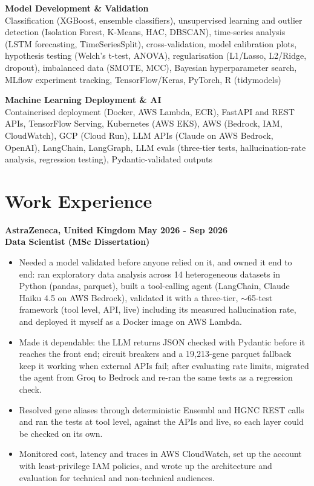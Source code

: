 \documentclass[a4paper,11pt]{article}
\begin{document}
\vspace{3pt}
\noindent \textbf{Model Development \& Validation}
    \\
    Classification (XGBoost, ensemble classifiers), unsupervised learning and outlier detection (Isolation Forest, K-Means, HAC, DBSCAN), time-series analysis (LSTM forecasting, TimeSeriesSplit), cross-validation, model calibration plots, hypothesis testing (Welch's t-test, ANOVA), regularisation (L1/Lasso, L2/Ridge, dropout), imbalanced data (SMOTE, MCC), Bayesian hyperparameter search, MLflow experiment tracking, TensorFlow/Keras, PyTorch, R (tidymodels)

\vspace{3pt}
\noindent \textbf{Machine Learning Deployment \& AI}
    \\
    Containerised deployment (Docker, AWS Lambda, ECR), FastAPI and REST APIs, TensorFlow Serving, Kubernetes (AWS EKS), AWS (Bedrock, IAM, CloudWatch), GCP (Cloud Run), LLM APIs (Claude on AWS Bedrock, OpenAI), LangChain, LangGraph, LLM evals (three-tier tests, hallucination-rate analysis, regression testing), Pydantic-validated outputs

\section{Work Experience}
\vspace{2pt}

\noindent
\textbf{AstraZeneca, United Kingdom}
\hfill \textbf{May 2026 - Sep 2026}
\\
\textbf{Data Scientist (MSc Dissertation)}
\begin{itemize}
    \item Needed a model validated before anyone relied on it, and owned it end to end: ran exploratory data analysis across 14 heterogeneous datasets in Python (pandas, parquet), built a tool-calling agent (LangChain, Claude Haiku 4.5 on AWS Bedrock), validated it with a three-tier, $\sim$65-test framework (tool level, API, live) including its measured hallucination rate, and deployed it myself as a Docker image on AWS Lambda.
    \item Made it dependable: the LLM returns JSON checked with Pydantic before it reaches the front end; circuit breakers and a 19,213-gene parquet fallback keep it working when external APIs fail; after evaluating rate limits, migrated the agent from Groq to Bedrock and re-ran the same tests as a regression check.
    \item Resolved gene aliases through deterministic Ensembl and HGNC REST calls and ran the tests at tool level, against the APIs and live, so each layer could be checked on its own.
    \item Monitored cost, latency and traces in AWS CloudWatch, set up the account with least-privilege IAM policies, and wrote up the architecture and evaluation for technical and non-technical audiences.
\end{itemize}
\end{document}

